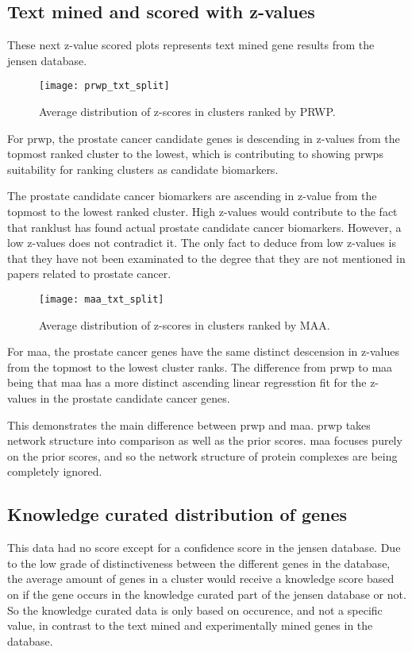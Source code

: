 \subsection{Text mined and scored with z-values}
These next z-value scored plots represents text mined gene results from the
\gls{jensen} database.

\begin{figure}[H]
    \label{fig:txt-iref-prwp}
    \texttt{[image: prwp\_txt\_split]}
    \caption{Average distribution of z-scores in clusters ranked by PRWP.}
\end{figure}
For \gls{prwp}, the prostate cancer candidate genes is descending in z-values
from the topmost ranked cluster to the lowest, which is contributing to
showing \gls{prwp}s suitability for ranking clusters as candidate biomarkers. 

The prostate candidate cancer biomarkers are ascending in z-value from the
topmost to the lowest ranked cluster. High z-values would contribute to the fact
that ranklust has found actual prostate candidate cancer biomarkers. However,
a low z-values does not contradict it. The only fact to deduce from low z-values
is that they have not been examinated to the degree that they are not mentioned
in papers related to prostate cancer.

\begin{figure}[H]
    \label{fig:txt-iref-maa}
    \texttt{[image: maa\_txt\_split]}
    \caption{Average distribution of z-scores in clusters ranked by MAA.}
\end{figure}
For \gls{maa}, the prostate cancer genes have the same distinct descension in
z-values from the topmost to the lowest cluster ranks. The difference from
\gls{prwp} to \gls{maa} being that \gls{maa} has a more distinct ascending
linear regresstion fit for the z-values in the prostate candidate cancer genes.

This demonstrates the main difference between \gls{prwp} and \gls{maa}.
\gls{prwp} takes network structure into comparison as well as the prior scores.
\gls{maa} focuses purely on the prior scores, and so the network structure of
protein complexes are being completely ignored.

\subsection{Knowledge curated distribution of genes}
This data had no score except for a confidence score in the \gls{jensen}
database. Due to the low grade of distinctiveness between the different genes in
the database, the average amount of genes in a cluster would receive a knowledge
score based on if the gene occurs in the knowledge curated part of the
\gls{jensen} database or not. So the knowledge curated data is only based on
occurence, and not a specific value, in contrast to the text mined and
experimentally mined genes in the database.


